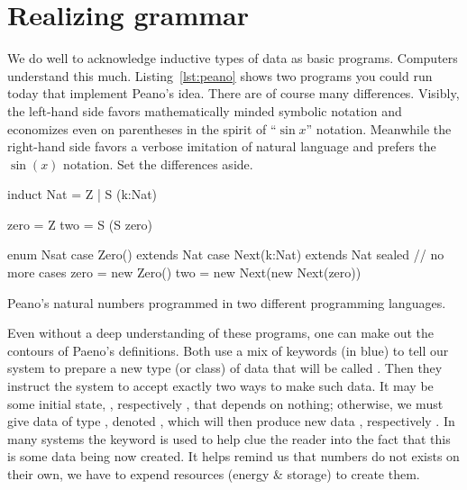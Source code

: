 \section{Realizing grammar}

We do well to acknowledge inductive types of data as basic programs. Computers
understand this much. Listing~\ref{lst:peano} shows two programs you could run
today that implement Peano's idea. There are of course many differences.
Visibly, the left-hand side favors mathematically minded symbolic notation and
economizes even on parentheses in the spirit of ``$\sin x$'' notation. Meanwhile
the right-hand side favors a verbose imitation of natural language and prefers
the $\sin(x)$ notation.  Set the differences aside.

\begin{lstfloat}
\begin{center}
\begin{minipage}{0.37\textwidth}
\begin{Fcode}[]
induct Nat = Z 
    | S (k:Nat)

zero = Z
two = S (S zero)
\end{Fcode}
\end{minipage}
\hfill
\begin{minipage}{0.62\textwidth}
\begin{Pcode}[language=Sava]
enum Nsat
  case Zero() extends Nat
  case Next(k:Nat) extends Nat
sealed  // no more cases
zero = new Zero()
two = new Next(new Next(zero))
\end{Pcode}
\end{minipage}
\end{center}
\caption{Peano's natural numbers programmed in two different programming languages.}
\label{lst:peano}
\end{lstfloat}
    

Even without a deep understanding of these programs, one can make out the
contours of Paeno's definitions.  Both use a mix of keywords (in blue) to tell
our system to prepare a new type (or class) of data that will be called
.  Then they instruct the system to accept exactly two ways to make
such data. It may be some initial state, , respectively ,
that depends on nothing; otherwise, we must give data  of type
, denoted , which will then produce new data ,
respectively .  In many systems the keyword  is 
used to help clue the reader into the fact that this is some data being now 
created.  It helps remind us that numbers do not  exists on their own, 
we have to expend resources (energy \& storage) to create them. 

